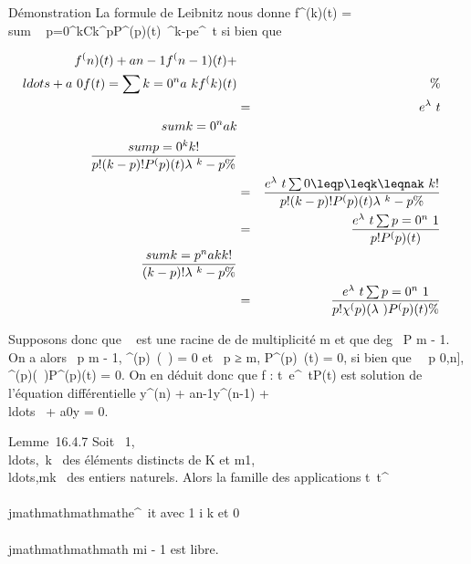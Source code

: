 Démonstration La formule de Leibnitz nous donne f^(k)(t)
= \\sum ~
p=0^kCk^pP^(p)(t)\lambda~^k-pe^\lambda~t
si bien que

\begin{align*} f^(n)(t) + a
n-1f^(n-1)(t) +
\\ldots + a~
0f(t) = \sum k=0^na~
kf^(k)(t)&&\%& \\ & =&
e^\lambda~t \\sum
k=0^na k \\sum
p=0^k k! \over p!(k - p)!
P^(p)(t)\lambda~^k-p \%&
\\ & =& e^\lambda~t
\sum 0\leqp\leqk\leqnak~ k!
\over p!(k - p)! P^(p)(t)\lambda~^k-p
\%& \\ & =& e^\lambda~t
\sum p=0^n~ 1
\over p! P^(p)(t)\\sum
k=p^na k k! \over (k - p)!
\lambda~^k-p\%& \\ & =&
e^\lambda~t \sum p=0^n~ 1
\over p! \chi^(p)(\lambda~)P^(p)(t) \%&
\\ \end{align*}

Supposons donc que \lambda~ est une racine de \chi de multiplicité m et que
deg~ P \leq m - 1. On a alors
\forall~p \leq m - 1, \chi^(p)~(\lambda~) = 0 et
\forall~p ≥ m, P^(p)~(t) = 0, si bien que
\forall~~p \in {[}0,n{]},
\chi^(p)(\lambda~)P^(p)(t) = 0. On en déduit donc que f :
t\mapsto~e^\lambda~tP(t) est solution de
l'équation différentielle y^(n) +
an-1y^(n-1) +
\\ldots~ +
a0y = 0.

Lemme~16.4.7 Soit
\lambda~1,\\ldots,\lambda~k~
des éléments distincts de K et
m1,\\ldots,mk~
des entiers naturels. Alors la famille des applications
t\mapsto~t^\\\\jmathmathmathmathe^\lambda~it
avec 1 \leq i \leq k et 0 \leq \\\\jmathmathmathmath \leq mi - 1 est libre.

